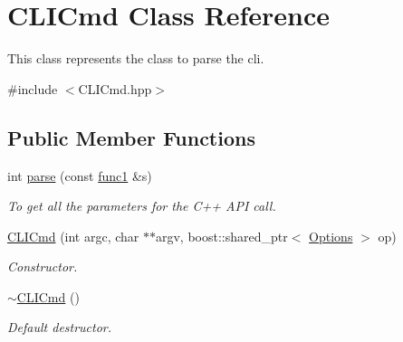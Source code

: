 \hypertarget{classCLICmd}{
\section{CLICmd Class Reference}
\label{classCLICmd}
}


This class represents the class to parse the cli.  




{\ttfamily \#include $<$CLICmd.hpp$>$}

\subsection*{Public Member Functions}
\begin{DoxyCompactItemize}
\item 
int \hyperlink{classCLICmd_a867bca3ebdb191e644ddd4de0a4bee98}{parse} (const \hyperlink{Options_8hpp_a3e992ba9ff50fb8a17ae2d36ea9b3f80}{func1} \&s)
\begin{DoxyCompactList}\small\item\em To get all the parameters for the C++ API call. \item\end{DoxyCompactList}\item 
\hyperlink{classCLICmd_a574259371aeb8b67f3b83a4e0c477255}{CLICmd} (int argc, char $\ast$$\ast$argv, boost::shared\_\-ptr$<$ \hyperlink{classOptions}{Options} $>$ op)
\begin{DoxyCompactList}\small\item\em Constructor. \item\end{DoxyCompactList}\item 
\hypertarget{classCLICmd_a4084198949bd825f8b9440a10637963c}{
\hyperlink{classCLICmd_a4084198949bd825f8b9440a10637963c}{$\sim$CLICmd} ()}
\label{classCLICmd_a4084198949bd825f8b9440a10637963c}

\begin{DoxyCompactList}\small\item\em Default destructor. \item\end{DoxyCompactList}\end{DoxyCompactItemize}
